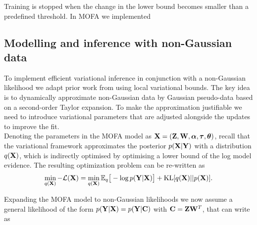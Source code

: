 Training is stopped when the change in the lower bound becomes smaller than a predefined threshold. In MOFA we implemented

\subsection{Modelling and inference with non-Gaussian data} \label{section:mofa_ngaussian}
To implement efficient variational inference in conjunction with a non-Gaussian likelihood we adapt prior work from \cite{Seeger2012} using local variational bounds. The key idea is to dynamically approximate non-Gaussian data by Gaussian pseudo-data based on a second-order Taylor expansion.  To make the approximation justifiable we need to introduce variational parameters that are adjusted alongside the updates to improve the fit.	\\
Denoting the parameters in the MOFA model as ${\bf X}= ({\bf Z},{\bf W},\mbox{\boldmath $\alpha$},\mbox{\boldmath $\tau$},\mbox{\boldmath $\theta$})$, recall that the variational framework approximates the posterior $p({\bf X} | {\bf Y} )$ with a distribution $q({\bf X})$, which is indirectly optimised by optimising a lower bound of the log model evidence. The resulting optimization problem can be re-written as
\begin{equation*}
\min_{q({\bf X})} -\mathcal{L}({\bf X}) =  \min_{q({\bf X})} \mathbb{E}_q \big[ -\log p({\bf Y}|{\bf X}) \big] + {\rm KL}[q({\bf X})||p({\bf X})].
\end{equation*}


Expanding the MOFA model to non-Gaussian likelihoods we now assume a general likelihood of the form $p({\bf Y}|{\bf X})=p({\bf Y}|{\bf C})$ with ${\bf C} = {\bf Z}{\bf W}^{T}$, that can write as

